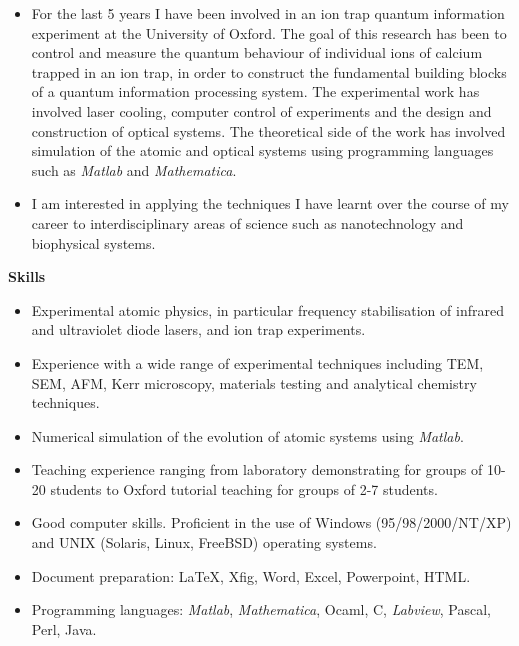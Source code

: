 \documentclass[11pt,a4paper]{article}
\begin{document}
\begin{itemize}
\item For the last 5 years I have been involved in an ion trap quantum
  information experiment at the University of Oxford.  The goal of
  this research has been to control and measure the quantum behaviour
  of individual ions of calcium trapped in an ion trap, in order to
  construct the fundamental building blocks of a quantum information
  processing system.  The experimental work has involved laser
  cooling, computer control of experiments and the design and
  construction of optical systems.  The theoretical side of the work
  has involved simulation of the atomic and optical systems using
  programming languages such as \textit{Matlab} and \textit{Mathematica}. 
\item I am interested in applying the techniques I have learnt over
  the course of my career to interdisciplinary areas of science 
  such as nanotechnology and biophysical systems.
\end{itemize}


{\large \textbf{Skills}}
\begin{itemize}
  \item Experimental atomic physics, in particular frequency
    stabilisation of infrared and ultraviolet diode lasers, and  
    ion trap experiments. 
  \item Experience with a wide range of experimental techniques including
    TEM, SEM, AFM, Kerr microscopy, materials testing and analytical chemistry
    techniques.
  \item Numerical simulation of the evolution of atomic systems using
    \textit{Matlab}.
   \item Teaching experience ranging from laboratory demonstrating for groups
    of 10-20 students to Oxford tutorial teaching for groups of 
    2-7 students. 
  \item Good computer skills. Proficient in the use of Windows
    (95/98/2000/NT/XP) and UNIX (Solaris, Linux, FreeBSD) operating
    systems.
  \item Document preparation: \LaTeX, Xfig, Word, Excel, Powerpoint,
    HTML.
  \item Programming languages:  \textit{Matlab}, \textit{Mathematica},
    Ocaml, C, \textit{Labview}, Pascal, Perl, Java.
\end{itemize}
%
%
\end{document}
